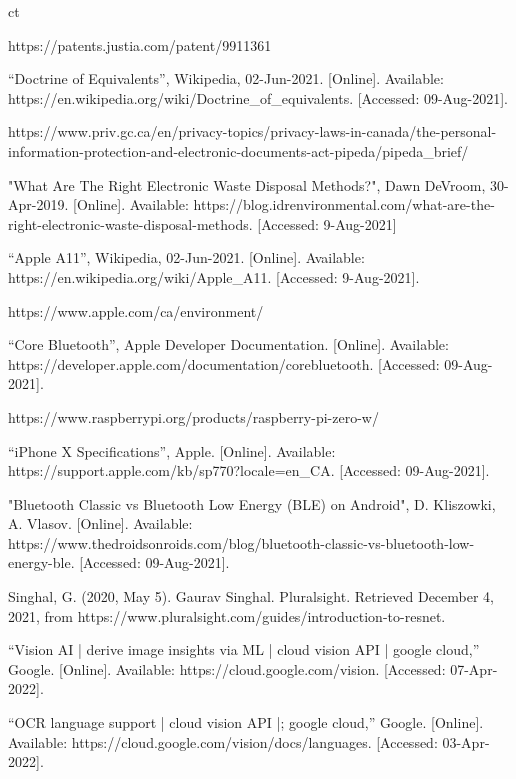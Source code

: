 ct\documentclass[a4paper,11pt]{article}
\begin{document}
\begin{thebibliography}{9}
https://patents.justia.com/patent/9911361

“Doctrine of Equivalents”, Wikipedia, 02-Jun-2021. [Online]. Available: https://en.wikipedia.org/wiki/Doctrine\_of\_equivalents. [Accessed: 09-Aug-2021].

https://www.priv.gc.ca/en/privacy-topics/privacy-laws-in-canada/the-personal-information-protection-and-electronic-documents-act-pipeda/pipeda\_brief/

"What Are The Right Electronic Waste Disposal Methods?", Dawn DeVroom, 30-Apr-2019. [Online]. Available: https://blog.idrenvironmental.com/what-are-the-right-electronic-waste-disposal-methods. [Accessed: 9-Aug-2021]

“Apple A11”, Wikipedia, 02-Jun-2021. [Online]. Available:
https://en.wikipedia.org/wiki/Apple\_A11. [Accessed: 9-Aug-2021].

https://www.apple.com/ca/environment/

“Core Bluetooth”, Apple Developer Documentation. [Online]. Available: https://developer.apple.com/documentation/corebluetooth. [Accessed: 09-Aug-2021]. 

https://www.raspberrypi.org/products/raspberry-pi-zero-w/

“iPhone X Specifications”, Apple. [Online]. Available: https://support.apple.com/kb/sp770?locale=en\_CA. [Accessed: 09-Aug-2021]. 

"Bluetooth Classic vs Bluetooth Low Energy (BLE) on Android", D. Kliszowki, A. Vlasov. [Online]. Available: https://www.thedroidsonroids.com/blog/bluetooth-classic-vs-bluetooth-low-energy-ble. [Accessed: 09-Aug-2021].

Singhal, G. (2020, May 5). Gaurav Singhal. Pluralsight. Retrieved December 4, 2021, from https://www.pluralsight.com/guides/introduction-to-resnet.

“Vision AI | derive image insights via ML | cloud vision API | google cloud,” Google. [Online]. Available: https://cloud.google.com/vision. [Accessed: 07-Apr-2022]. 

“OCR language support | cloud vision API |; google cloud,” Google. [Online]. Available: https://cloud.google.com/vision/docs/languages. [Accessed: 03-Apr-2022]. 


\end{thebibliography}
\end{document}
